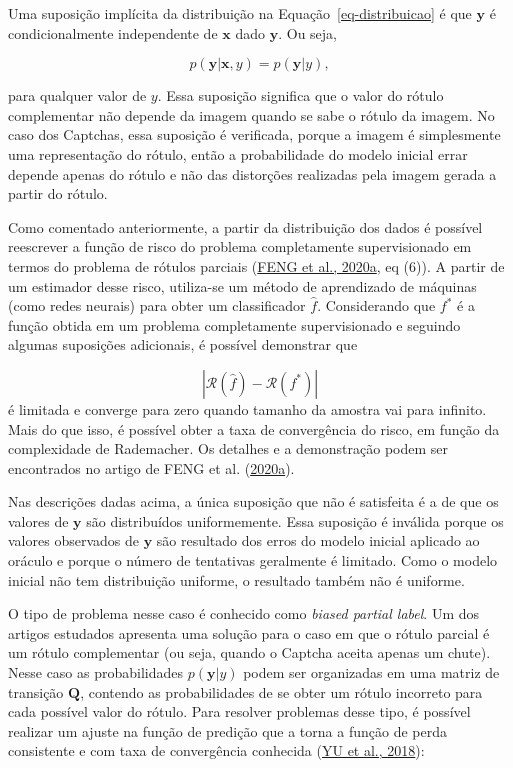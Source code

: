 \documentclass[12pt,twoside,brazilian]{book}
\begin{document}
Uma suposição implícita da distribuição na Equação~\ref{eq-distribuicao}
é que \({\mathbf y}\) é condicionalmente independente de \({\mathbf x}\)
dado \({\mathbf y}\). Ou seja,

\[
p(\mathbf y|\mathbf x, y) = p(\mathbf y| y),
\]

para qualquer valor de \(y\). Essa suposição significa que o valor do
rótulo complementar não depende da imagem quando se sabe o rótulo da
imagem. No caso dos Captchas, essa suposição é verificada, porque a
imagem é simplesmente uma representação do rótulo, então a probabilidade
do modelo inicial errar depende apenas do rótulo e não das distorções
realizadas pela imagem gerada a partir do rótulo.

Como comentado anteriormente, a partir da distribuição dos dados é
possível reescrever a função de risco do problema completamente
supervisionado em termos do problema de rótulos parciais
(\protect\hyperlink{ref-feng2020}{FENG et al., 2020a}, eq (6)). A partir
de um estimador desse risco, utiliza-se um método de aprendizado de
máquinas (como redes neurais) para obter um classificador \(\hat f\).
Considerando que \(f^*\) é a função obtida em um problema completamente
supervisionado e seguindo algumas suposições adicionais, é possível
demonstrar que

\[
|\mathcal R(\hat f) - \mathcal R(f^*)|
\] é limitada e converge para zero quando tamanho da amostra vai para
infinito. Mais do que isso, é possível obter a taxa de convergência do
risco, em função da complexidade de Rademacher. Os detalhes e a
demonstração podem ser encontrados no artigo de FENG et al.
(\protect\hyperlink{ref-feng2020}{2020a}).

Nas descrições dadas acima, a única suposição que não é satisfeita é a
de que os valores de \(\mathbf y\) são distribuídos uniformemente. Essa
suposição é inválida porque os valores observados de \(\mathbf y\) são
resultado dos erros do modelo inicial aplicado ao oráculo e porque o
número de tentativas geralmente é limitado. Como o modelo inicial não
tem distribuição uniforme, o resultado também não é uniforme.

O tipo de problema nesse caso é conhecido como \emph{biased partial
label}. Um dos artigos estudados apresenta uma solução para o caso em
que o rótulo parcial é um rótulo complementar (ou seja, quando o Captcha
aceita apenas um chute). Nesse caso as probabilidades
\(p(\mathbf y| y)\) podem ser organizadas em uma matriz de transição
\(\mathbf Q\), contendo as probabilidades de se obter um rótulo
incorreto para cada possível valor do rótulo. Para resolver problemas
desse tipo, é possível realizar um ajuste na função de predição que a
torna a função de perda consistente e com taxa de convergência conhecida
(\protect\hyperlink{ref-yu2018}{YU et al., 2018}):
\end{document}

